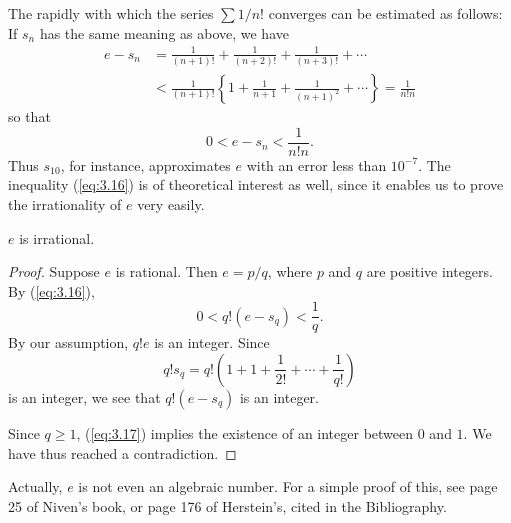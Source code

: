 The rapidly with which the series $\sum 1/n!$ converges can be estimated as follows: If $s_n$ has the same meaning as above, we have
\begin{align*}
    e - s_n
    &= \frac{1}{(n+1)!}
    + \frac{1}{(n+2)!}
    + \frac{1}{(n+3)!}
    + \cdots \\
    &< \frac{1}{(n+1)!}\left\{
        1
        + \frac{1}{n+1}
        + \frac{1}{(n+1)^2}
        + \cdots
    \right\} = \frac{1}{n!n}
\end{align*}
so that
\begin{equation}
    \label{eq:3.16}
    0 < e - s_n < \frac{1}{n!n}.
\end{equation}
Thus $s_{10}$, for instance, approximates $e$ with an error less than $10^{-7}$.
The inequality (\ref{eq:3.16}) is of theoretical interest as well, since it enables us to prove the irrationality of $e$ very easily.

\begin{thm}
    \label{thm:3.32}
    $e$ is irrational.
\end{thm}

\begin{proof}
    Suppose $e$ is rational. Then $e = p/q$, where $p$ and $q$ are positive integers. 
    By (\ref{eq:3.16}),
    \begin{equation}
        \label{eq:3.17}
        0<q!(e-s_q)<\frac{1}{q}.
    \end{equation}
    By our assumption, $q!e$ is an integer. Since
    \begin{equation*}
        q!s_q = 
        q!\left(
            1 + 1 + \frac{1}{2!} + \cdots + \frac{1}{q!}
        \right)
    \end{equation*}
    is an integer, we see that $q!(e-s_q)$ is an integer.

    Since $q \geq 1$, (\ref{eq:3.17}) implies the existence of an integer between $0$ and $1$. We have thus reached a contradiction.
\end{proof}

Actually, $e$ is not even an algebraic number.
For a simple proof of this, see page 25 of Niven's book, or page 176 of Herstein's, cited in the Bibliography.
